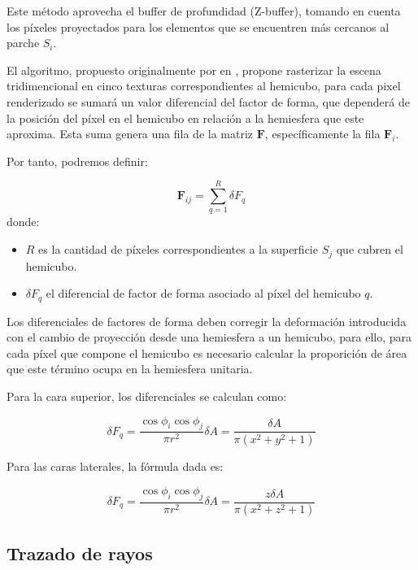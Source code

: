 Este método aprovecha el buffer de profundidad (Z-buffer), tomando en cuenta los píxeles proyectados para los elementos que se encuentren más cercanos al parche $S_{i}$.

El algoritmo, propuesto originalmente por \citeauthor{Cohen} en \citeyear{Cohen}, propone rasterizar la escena tridimencional en cinco texturas correspondientes al hemicubo, para cada pixel renderizado se sumará un valor diferencial del factor de forma, que dependerá de la posición del píxel en el hemicubo en relación a la hemiesfera que este aproxima. Esta suma genera una fila de la matriz $\mathbf{F}$, específicamente la fila $\mathbf{F}_{i}$.

Por tanto, podremos definir:

\begin{equation}
	\mathbf{F}_{ij} = \sum_{q=1}^{R} \delta{F_{q}}
	\label{eq:ffgreenberg}
\end{equation}
donde:
\begin{itemize}
	\item $R$ es la cantidad de píxeles correspondientes a la superficie $S_{j}$ que cubren el hemicubo.
	\item $\delta{F_{q}}$ el diferencial de factor de forma asociado al píxel del hemicubo $q$.
\end{itemize}

Los diferenciales de factores de forma deben corregir la deformación introducida con el cambio de proyección desde una hemiesfera a un hemicubo, para ello, para cada píxel que compone el hemicubo es necesario calcular la proporición de área que este término ocupa en la hemiesfera unitaria.

Para la cara superior, los diferenciales se calculan como:

\begin{equation}
	\delta{F_{q}} = \frac{\cos{\phi_{i}}\cos{\phi_{j}}}{\pi{r^{2}}} \delta{A} = \frac{\delta{A}}{\pi({x^{2} + y^{2} + 1})} 
\end{equation}

Para las caras laterales, la fórmula dada es:

\begin{equation}
\delta{F_{q}} = \frac{\cos{\phi_{i}}\cos{\phi_{j}}}{\pi{r^{2}}}\delta{A} = \frac{z\delta{A}}{\pi({x^{2} + z^{2} + 1})}
\end{equation}


\subsection{Trazado de rayos}
\label{sec:raytracing}

